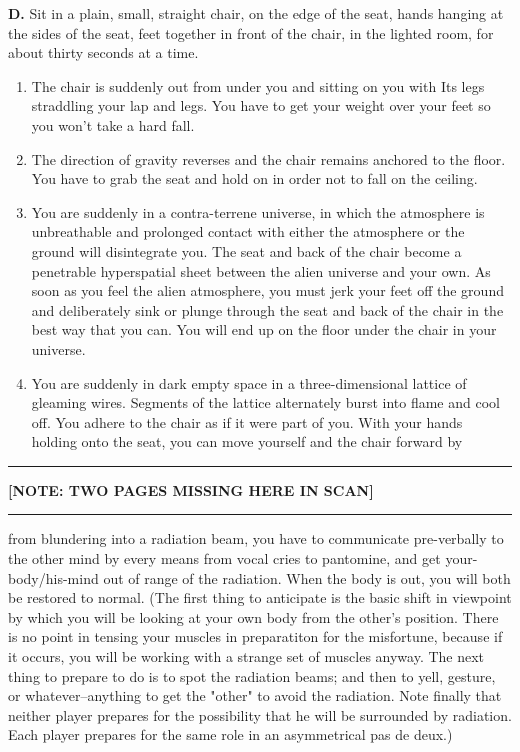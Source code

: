 \textbf{D.} Sit in a plain, small, straight chair, on the edge of the seat, hands 
hanging at the sides of the seat, feet together in front of the chair, in the 
lighted room, for about thirty seconds at a time. 

\begin{enumerate}
\item The chair is suddenly out from under you and sitting on you with Its legs 
straddling your lap and legs. You have to get your weight over your feet so 
you won't take a hard fall. 

\item The direction of gravity reverses and the chair remains anchored to the 
floor. You have to grab the seat and hold on in order not to fall on the 
ceiling. 

\item You are suddenly in a contra-terrene universe, in which the atmosphere is 
unbreathable and prolonged contact with either the atmosphere or the 
ground will disintegrate you. The seat and back of the chair become a 
penetrable hyperspatial sheet between the alien universe and your own. As 
soon as you feel the alien atmosphere, you must jerk your feet off the 
ground and deliberately sink or plunge through the seat and back of the chair 
in the best way that you can. You will end up on the floor under the chair in 
your universe. 

\item You are suddenly in dark empty space in a three-dimensional lattice of 
gleaming wires. Segments of the lattice alternately burst into flame and cool 
off. You adhere to the chair as if it were part of you. With your hands 
holding onto the seat, you can move yourself and the chair forward by 

\end{enumerate}

\plainbreak{2}

\textbf{[NOTE: TWO PAGES MISSING HERE IN SCAN]}

\plainbreak{2}

from blundering into a radiation beam, you have to communicate 
pre-verbally to the other mind by every means from vocal cries to 
pantomine, and get your-body/his-mind out of range of the radiation. When 
the body is out, you will both be restored to normal. (The first thing to 
anticipate is the basic shift in viewpoint by which you will be looking at 
your own body from the other's position. There is no point in tensing your 
muscles in preparatiton for the misfortune, because if it occurs, you will be 
working with a strange set of muscles anyway. The next thing to prepare to 
do is to spot the radiation beams; and then to yell, gesture, or 
whatever--anything to get the "other" to avoid the radiation. Note finally 
that neither player prepares for the possibility that he will be surrounded by 
radiation. Each player prepares for the same role in an asymmetrical pas de 
deux.) 

